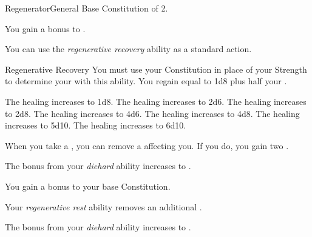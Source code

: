     \begin{feat}{Regenerator}{General}
        \featpre Base Constitution of 2.

         You gain a  bonus to .

         You can use the \textit{regenerative recovery} ability as a standard action.
        \begin{freeability}{Regenerative Recovery}
            You must use your Constitution in place of your Strength to determine your  with this ability.
            You regain  equal to 1d8 plus half your .

            \rankline
             The healing increases to 1d8.
             The healing increases to 2d6.
             The healing increases to 2d8.
             The healing increases to 4d6.
             The healing increases to 4d8.
             The healing increases to 5d10.
             The healing increases to 6d10.
        \end{freeability}

         When you take a , you can remove a  affecting you.
        If you do, you gain two .

         The bonus from your \textit{diehard} ability increases to .

         You gain a  bonus to your base Constitution.

         Your \textit{regenerative rest} ability removes an additional .

         The bonus from your \textit{diehard} ability increases to .
    \end{feat}

